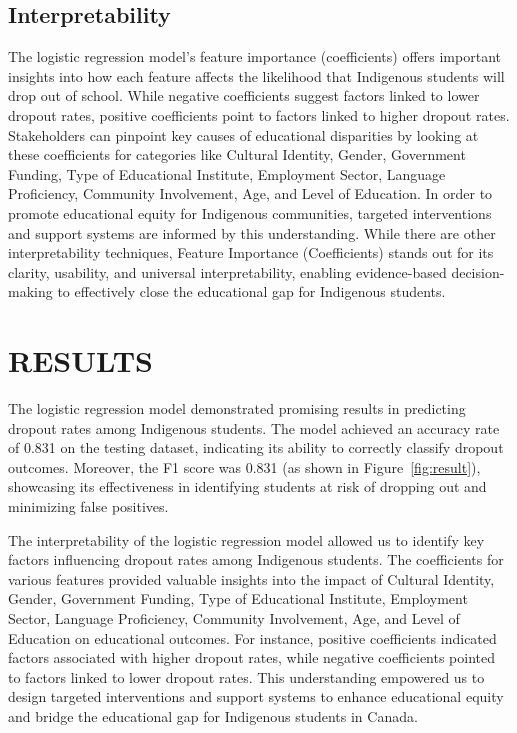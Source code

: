 \documentclass[a4paper,twoside]{article}
\begin{document}
\subsection{Interpretability}
The logistic regression model's feature importance (coefficients) offers important insights into how each feature affects the likelihood that Indigenous students will drop out of school. While negative coefficients suggest factors linked to lower dropout rates, positive coefficients point to factors linked to higher dropout rates. Stakeholders can pinpoint key causes of educational disparities by looking at these coefficients for categories like Cultural Identity, Gender, Government Funding, Type of Educational Institute, Employment Sector, Language Proficiency, Community Involvement, Age, and Level of Education. In order to promote educational equity for Indigenous communities, targeted interventions and support systems are informed by this understanding. While there are other interpretability techniques, Feature Importance (Coefficients) stands out for its clarity, usability, and universal interpretability, enabling evidence-based decision-making to effectively close the educational gap for Indigenous students.

\section{\uppercase{Results}}
The logistic regression model demonstrated promising results in predicting dropout rates among Indigenous students. The model achieved an accuracy rate of 0.831 on the testing dataset, indicating its ability to correctly classify dropout outcomes. Moreover, the F1 score was 0.831 (as shown in Figure~\ref{fig:result}), showcasing its effectiveness in identifying students at risk of dropping out and minimizing false positives.

The interpretability of the logistic regression model allowed us to identify key factors influencing dropout rates among Indigenous students. The coefficients for various features provided valuable insights into the impact of Cultural Identity, Gender, Government Funding, Type of Educational Institute, Employment Sector, Language Proficiency, Community Involvement, Age, and Level of Education on educational outcomes. For instance, positive coefficients indicated factors associated with higher dropout rates, while negative coefficients pointed to factors linked to lower dropout rates. This understanding empowered us to design targeted interventions and support systems to enhance educational equity and bridge the educational gap for Indigenous students in Canada.
\end{document}
